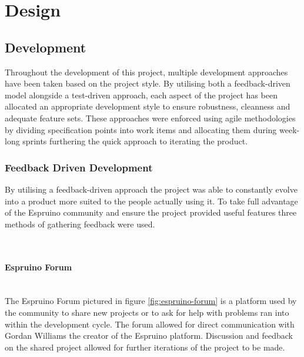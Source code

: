 \documentclass{l4proj}
\begin{document}
\chapter{Design}

\section{Development}

Throughout the development of this project, multiple development approaches have been taken based on the project style. By utilising both a feedback-driven model alongside a test-driven approach, each aspect of the project has been allocated an appropriate development style to ensure robustness, cleanness and adequate feature sets. These approaches were enforced using agile methodologies by dividing specification points into work items and allocating them during week-long sprints furthering the quick approach to iterating the product.

\subsection{Feedback Driven Development}
By utilising a feedback-driven approach the project was able to constantly evolve into a product more suited to the people actually using it. To take full advantage of the Espruino community and ensure the project provided useful features three methods of gathering feedback were used.

\text \\

\subsubsection{Espruino Forum}\hfill\\
The Espruino Forum pictured in figure \ref{fig:espruino-forum} is a platform used by the community to share new projects or to ask for help with problems ran into within the development cycle. The forum allowed for direct communication with Gordan Williams the creator of the Espruino platform. Discussion and feedback on the shared project allowed for further iterations of the project to be made.
\end{document}
